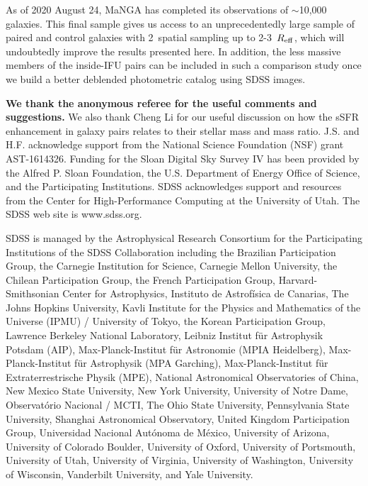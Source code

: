\documentclass[iop,revtex4,twocolumn,apj,numberedappendix,appendixfloats]{emulateapj}
\newcommand{\reff}{$R_{\rm eff}$}
\begin{document}
As of 2020 August 24, MaNGA has completed its observations of $\sim$10,000 galaxies. This final sample gives us access to an unprecedentedly large sample of paired and control galaxies with 2\arcsec\ spatial sampling up to 2-3~\reff, which will undoubtedly improve the results presented here. In addition, the less massive members of the inside-IFU pairs can be included in such a comparison study once we build a better deblended photometric catalog using SDSS images.

\acknowledgments

\textbf{We thank the anonymous referee for the useful comments and suggestions.} We also thank Cheng Li for our useful discussion on how the sSFR enhancement in galaxy pairs relates to their stellar mass and mass ratio. J.S. and H.F. acknowledge support from the National Science Foundation (NSF) grant AST-1614326. Funding for the Sloan Digital Sky Survey IV has been provided by the Alfred P. Sloan Foundation, the U.S. Department of Energy Office of Science, and the Participating Institutions. SDSS acknowledges support and resources from the Center for High-Performance Computing at the University of Utah. The SDSS web site is www.sdss.org.

SDSS is managed by the Astrophysical Research Consortium for the Participating Institutions of the SDSS Collaboration including the Brazilian Participation Group, the Carnegie Institution for Science, Carnegie Mellon University, the Chilean Participation Group, the French Participation Group, Harvard-Smithsonian Center for Astrophysics, Instituto de Astrofísica de Canarias, The Johns Hopkins University, Kavli Institute for the Physics and Mathematics of the Universe (IPMU) / University of Tokyo, the Korean Participation Group, Lawrence Berkeley National Laboratory, Leibniz Institut für Astrophysik Potsdam (AIP), Max-Planck-Institut für Astronomie (MPIA Heidelberg), Max-Planck-Institut für Astrophysik (MPA Garching), Max-Planck-Institut für Extraterrestrische Physik (MPE), National Astronomical Observatories of China, New Mexico State University, New York University, University of Notre Dame, Observatório Nacional / MCTI, The Ohio State University, Pennsylvania State University, Shanghai Astronomical Observatory, United Kingdom Participation Group, Universidad Nacional Autónoma de México, University of Arizona, University of Colorado Boulder, University of Oxford, University of Portsmouth, University of Utah, University of Virginia, University of Washington, University of Wisconsin, Vanderbilt University, and Yale University.



\end{document}
